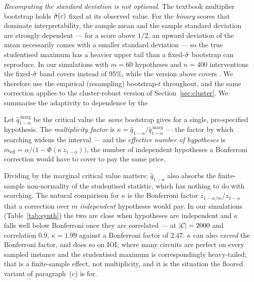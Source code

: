 \emph{Recomputing the standard deviation is not optional.} The textbook
multiplier bootstrap holds $\hat{\sigma}(c)$ fixed at its observed value. For the
\emph{binary} scores that dominate interpretability, the sample mean and the
sample standard deviation are strongly dependent --- for a score above $1/2$, an
upward deviation of the mean necessarily comes with a smaller standard deviation
--- so the true studentised maximum has a heavier upper tail than a fixed-$\hat{\sigma}$
bootstrap can reproduce. In our simulations with $m=60$ hypotheses and $n=400$
interventions the fixed-$\hat{\sigma}$ band covers \MyFixedSigmaCov{} instead of
$95\%$, while the version above covers \MyBootTCov{}. We therefore use the
empirical (resampling) bootstrap-$t$ throughout, and the same correction applies
to the cluster-robust version of Section~\ref{sec:cluster}. We summarise the
adaptivity to dependence by the

\begin{definition}
Let $\hat q^{\,\mathrm{marg}}_{1-\alpha}$ be the critical value the \emph{same}
bootstrap gives for a single, pre-specified hypothesis. The \emph{multiplicity
factor} is $\kappa=\hat q_{1-\alpha}/\hat q^{\,\mathrm{marg}}_{1-\alpha}$ --- the
factor by which searching widens the interval --- and the \emph{effective number
of hypotheses} is $m_{\mathrm{eff}}=\alpha/\big(1-\Phi(\kappa\,z_{1-\alpha})\big)$,
the number of independent hypotheses a Bonferroni correction would have to cover
to pay the same price.
\end{definition}

Dividing by the marginal critical value matters: $\hat q_{1-\alpha}$ also absorbs
the finite-sample non-normality of the studentised statistic, which has nothing
to do with searching. The natural comparison for $\kappa$ is the Bonferroni
factor $z_{1-\alpha/m}/z_{1-\alpha}$ that a correction over $m$ \emph{independent}
hypotheses would pay. In our simulations (Table~\ref{tab:synth}) the two are
close when hypotheses are independent and $\kappa$ falls well below Bonferroni
once they are correlated --- at $|\mathcal{C}|=2000$ and correlation $0.9$,
$\kappa=1.99$ against a Bonferroni factor of $2.47$. $\kappa$ can also
\emph{exceed} the Bonferroni factor, and does so on IOI, where many circuits are
perfect on every sampled instance and the studentised maximum is correspondingly
heavy-tailed; that is a finite-sample effect, not multiplicity, and it is the
situation the floored variant of paragraph~(c) is for.

